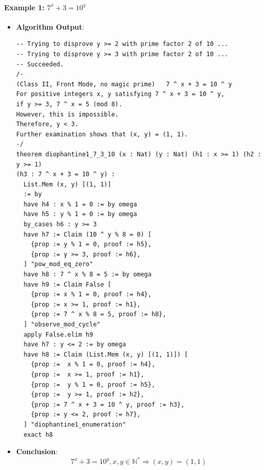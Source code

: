 \documentclass{article}
\begin{document}
\paragraph{Example 1: $7^x+3=10^y$}
\begin{itemize}
\item \textbf{Algorithm Output}:
    \begin{verbatim}
-- Trying to disprove y >= 2 with prime factor 2 of 10 ...
-- Trying to disprove y >= 3 with prime factor 2 of 10 ...
-- Succeeded.
/-
(Class II, Front Mode, no magic prime)   7 ^ x + 3 = 10 ^ y
For positive integers x, y satisfying 7 ^ x + 3 = 10 ^ y,
if y >= 3, 7 ^ x = 5 (mod 8).
However, this is impossible.
Therefore, y < 3.
Further examination shows that (x, y) = (1, 1).
-/
theorem diophantine1_7_3_10 (x : Nat) (y : Nat) (h1 : x >= 1) (h2 : y >= 1) 
(h3 : 7 ^ x + 3 = 10 ^ y) :
  List.Mem (x, y) [(1, 1)]
  := by
  have h4 : x % 1 = 0 := by omega
  have h5 : y % 1 = 0 := by omega
  by_cases h6 : y >= 3
  have h7 := Claim (10 ^ y % 8 = 0) [
    {prop := y % 1 = 0, proof := h5},
    {prop := y >= 3, proof := h6},
  ] "pow_mod_eq_zero"
  have h8 : 7 ^ x % 8 = 5 := by omega
  have h9 := Claim False [
    {prop := x % 1 = 0, proof := h4},
    {prop := x >= 1, proof := h1},
    {prop := 7 ^ x % 8 = 5, proof := h8},
  ] "observe_mod_cycle"
  apply False.elim h9
  have h7 : y <= 2 := by omega
  have h8 := Claim (List.Mem (x, y) [(1, 1)]) [
    {prop :=  x % 1 = 0, proof := h4},
    {prop :=  x >= 1, proof := h1},
    {prop :=  y % 1 = 0, proof := h5},
    {prop :=  y >= 1, proof := h2},
    {prop := 7 ^ x + 3 = 10 ^ y, proof := h3},
    {prop := y <= 2, proof := h7},
  ] "diophantine1_enumeration"
  exact h8
    \end{verbatim}
    \item \textbf{Conclusion}:
    \[ 7^x+3=10^y, x, y \in \mathbb{N}^* \Rightarrow (x,y)=(1,1) \]
\end{itemize}
\end{document}
